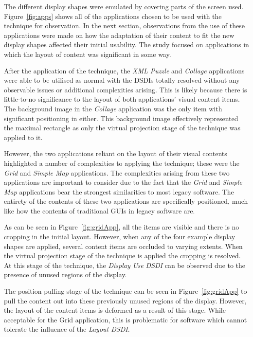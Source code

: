 \documentclass{bmcart}
\begin{document}

The different display shapes were emulated by covering parts of the screen used.
Figure~\ref{fig:apps} shows all of the applications chosen to be used with the technique for observation.
In the next section, observations from the use of these applications were made on how the adaptation of their content to fit the new display shapes affected their initial usability.
The study focused on applications in which the layout of content was significant in some way.

After the application of the technique, the {\emph{XML Puzzle}} and {\emph{Collage}} applications were able to be utilised as normal with the \acp{DSDI} totally resolved without any observable issues or additional complexities arising.
This is likely because there is little-to-no significance to the layout of both applications' visual content items.
The background image in the {\emph{Collage}} application was the only item with significant positioning in either.
This background image effectively represented the maximal rectangle as only the virtual projection stage of the technique was applied to it.

However, the two applications reliant on the layout of their visual
contents highlighted a number of complexities to applying the technique; these were the {\emph{Grid}} and {\emph{Simple Map}} applications.
The complexities arising from these two applications are important to consider due to the fact that the {\emph{Grid}} and {\emph{Simple Map}} applications bear the strongest similarities to most legacy software.
The entirety of the contents of these two applications are specifically positioned, much like how the contents of traditional GUIs in legacy software are.


As can be seen in Figure~\ref{fig:gridApp}, all the items are visible and there is no cropping in the initial layout.
However, when any of the four example display shapes are applied, several content items are occluded to varying extents.
When the virtual projection stage of the technique is applied the cropping is resolved.
At this stage of the technique, the {\emph{Display Use \ac{DSDI}}} can be observed due to the presence of unused regions of the display.

The position pulling stage of the technique can be seen in Figure~\ref{fig:gridApp} to pull the content out into these previously unused regions of the display.
However, the layout of the content items is deformed as a result of this stage.
While acceptable for the Grid application, this is problematic for software which cannot tolerate the influence of the {\emph{Layout \ac{DSDI}}}.
\end{document}
